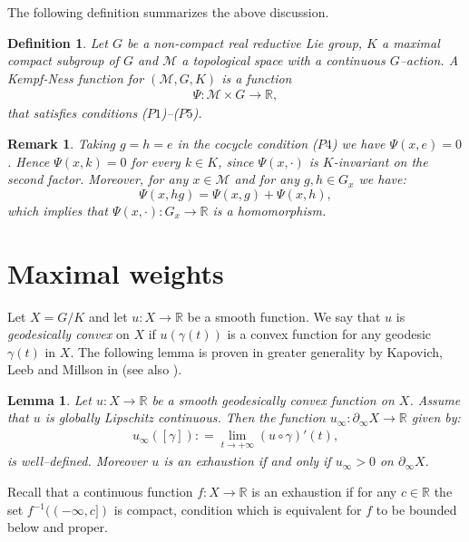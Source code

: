 \documentclass[leqno,11pt, a4]{amsart}
\newtheorem{defin}[equation]{Definition}
\newtheorem{remark}[equation]{Remark}
\newtheorem{lemma}[equation]{Lemma}
\theoremstyle{named}
\begin{document}
  The following definition summarizes the above discussion.
\begin{defin}
\label{def-kn}
Let $G$ be a non-compact real reductive Lie group, $K$ a maximal compact subgroup of $G$ and ${\mathscr{M}}$ a
  topological space with a continuous $G$--action. A \emph{Kempf-Ness
    function} for $({\mathscr{M}}, G,K)$ is a function
  \begin{gather*}
    \Psi : {\mathscr{M}} \times G {\rightarrow} {\mathbb{R}} ,
  \end{gather*}
  that satisfies conditions ($P1$)--($P5$).
\end{defin}
\begin{remark}\label{stabilizzatore-lineare}
Taking $g=h=e$ in the cocycle condition ($P4$) we
have $\Psi(x, e) = 0$. Hence $\Psi(x,k)=0$ for every $k\in K$, since $\Psi(x,\cdot)$ is $K$-invariant on the second factor.
Moreover, for any $x\in {\mathscr{M}}$ and for any $g,h\in G_x$ we have:
  \begin{equation}
    \label{somma}
    \Psi(x,hg)=\Psi(x,g)+\Psi(x,h),
  \end{equation}
which implies that $\Psi(x,\cdot):G_x {\longrightarrow} {\mathbb{R}}$ is a homomorphism.
\end{remark}
\section{Maximal weights}\label{maximal-weight-section}
Let $X=G/K$ and let $u: X {\rightarrow} {\mathbb{R}}$ be a smooth function. We say that $u$ is \emph{geodesically convex} on $X$ if  $u(\gamma(t))$ is a convex function for any geodesic $\gamma (t)$ in $X$.
The following lemma is proven in greater generality by Kapovich, Leeb
  and Millson in
  \cite[\S3.1]{kapovich-leeb-millson-convex-JDG} (see also \cite[\S 2.3]{bgs}).
\begin{lemma}\label{convex-function}
  Let $u: X {\rightarrow} {\mathbb{R}}$ be a smooth geodesically convex  function on $X$. Assume that
  $u$ is globally Lipschitz continuous.  Then the function
  ${u_\infty} : {\partial_\infty X} {\rightarrow} {\mathbb{R}}$ {given by:}
  \begin{gather}
    \label{eq:1}
    {u_\infty} ([{\gamma}]) : = \lim _{t \to +\infty } (u\circ{\gamma})'(t),
  \end{gather}
  is well--defined. Moreover $u$ is an exhaustion if and only if
  ${u_\infty} > 0$ on ${\partial_\infty X}$.
\end{lemma}
Recall that a continuous function $f: X {\rightarrow} {\mathbb{R}}$
is an exhaustion if for any $c\in {\mathbb{R}}$ the set
  $f{^{-1}} ((-\infty, c])$ is compact, condition which is equivalent for $f$ to be bounded below and proper.
\end{document}
